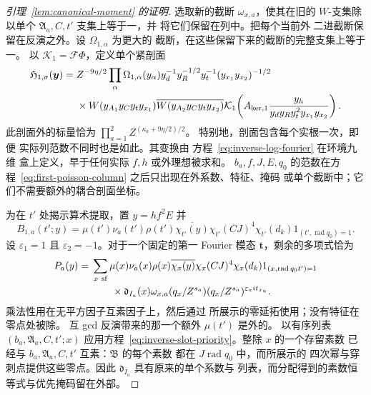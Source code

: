 \documentclass[11pt,a4paper]{article}
\numberwithin{equation}{section}
\numberwithin{figure}{section}
\theoremstyle{definition}
\theoremstyle{remark}
\begin{document}
\begin{proof}[引理~\ref{lem:canonical-moment} 的证明]
选取新的截断 \(\omega_{x,a}\)，使其在旧的
\(W\)-支集除以单个 \(\mathfrak A_a,C,t'\)
支集上等于一，并
将它们保留在列中。把每个当前外
二进截断保留在反演之外。设 \(\Omega_{1,\alpha}\) 为更大的
截断，在这些保留下来的截断的完整支集上等于一。
以 \(\mathcal K_1=\mathcal F\Phi\)，定义单个紧剖面
\begin{equation}\label{eq:inverse-first-profile}
 \begin{split}
 \mathfrak H_{1,\sigma}(\boldsymbol y)={}&Z^{-9\eta/2}
 \prod_\alpha\Omega_{1,\alpha}(y_\alpha)
 y_d^{-1}y_R^{-1/2}y_t^{-1}(y_{x_1}y_{x_2})^{-1/2}\\
 &\times W(y_{A_1}y_Cy_ty_{x_1})
       \overline{W(y_{A_2}y_Cy_ty_{x_2})}
 \mathcal K_1\!\left(A_{{\rm ker},1}
       \frac{y_h}{y_dy_Ry_t^2y_{x_1}y_{x_2}}\right).
 \end{split}
\end{equation}
此剖面外的标量恰为
\(\prod_{a=1}^2Z^{(\kappa_a+9\eta/2)/2}\)。
特别地，剖面包含每个实根一次，即便
实际列范数不同时也是如此。其变换由
方程~\eqref{eq:inverse-log-fourier} 在环境九维
盒上定义，早于任何实际 \(f,h\) 或外理想被求和。
\(b_a,f,J,E,q_0\) 的范数在方程~\eqref{eq:first-poisson-column} 之后只出现在外系数、特征、掩码
或单个截断中；它们不需要额外的耦合剖面坐标。

为在 \(t'\) 处揭示算术提取，置 \(y=hf^2E\) 并
\[
 B_{1,a}(t';y)=\mu(t')\nu_a(t')\rho(t')\overline{\chi_{t'}(y)}
       \chi_{t'}(CJ)^4\chi_{t'}(d_k)1_{(t',\operatorname{rad}q_0)=1}.
\]
设 \(\varepsilon_1=1\) 且 \(\varepsilon_2=-1\)。对于一个固定的第一
Fourier 模态 \(\boldsymbol t\)，剩余的多项式恰为
\begin{equation}\label{eq:inverse-first-polynomial}
 \begin{split}
 P_a(y)={}&\sum_{x\ {\rm sf}}\mu(x)\nu_a(x)\rho(x)
       \overline{\chi_x(y)}\chi_x(CJ)^4\chi_x(d_k)
       1_{(x,\operatorname{rad}q_0t')=1}\\
 &\qquad\times\mathfrak d_{I_a}(x)\omega_{x,a}(q_x/Z^{s_a})
                  (q_x/Z^{s_a})^{\varepsilon_a it_{x_a}}.
 \end{split}
\end{equation}
乘法性用在无平方因子互素因子上，然后通过
所展示的零延拓使用；没有特征在零点处被除。
互 gcd 反演带来的那一个额外 \(\mu(t')\) 是外的。
以有序列表
\((b_a,\mathfrak A_a,C,t';x)\) 应用方程~\eqref{eq:inverse-slot-priority}。整除 \(x\) 的一个存留素数
已经与 \(b_a,\mathfrak A_a,C,t'\) 互素：\(\mathfrak B\) 的每个素数
都在 \(J\operatorname{rad}q_0\) 中，而所展示的
四次幂与穿刺点提供这些零点。因此
\(\mathfrak d_{I_a}\) 具有原来的单个系数与
列表，而分配得到的素数恒等式与优先掩码留在外部。


\end{proof}
\end{document}
